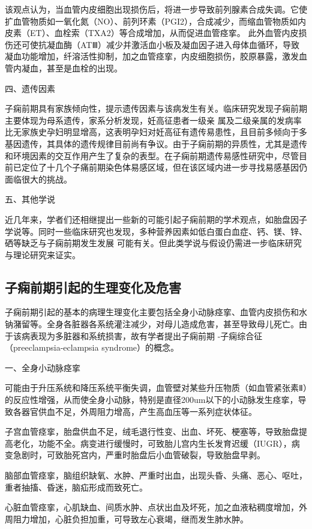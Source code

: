 该观点认为，当血管内皮细胞出现损伤后，将进一步导致前列腺素合成失调\cite{OAG9,Sibai2005}。它使扩血管物质如一氧化氮（NO）、前列环素（PGI2），合成减少，而缩血管物质如内皮素（ET）、血栓索（TXA2）等合成增加，从而促进血管痉挛。
此外血管内皮损伤还可使抗凝血酶（ATⅢ）减少并激活血小板及凝血因子进入母体血循环，导致凝血功能增加，纤溶活性抑制，加之血管痉挛，内皮细胞损伤，胶原暴露，激发血管内凝血，甚至是血栓的出现。

四、遗传因素

子痫前期具有家族倾向性，提示遗传因素与该病发生有关\cite{OAG9,Sibai2005}。临床研究发现子痫前期主要体现为母系遗传，家系分析发现\cite{Ge2013}，妊高征患者一级亲
属及二级亲属的发病率比无家族史孕妇明显增高，这表明孕妇对妊高征有遗传易患性，且目前多倾向于多基因遗传，其具体的遗传规律目前尚有争议。由于子痫前期的异质性，尤其是遗传
和环境因素的交互作用产生了复杂的表型。在子痫前期遗传易感性研究中，尽管目前已定位了十几个子痛前期染色体易感区域，但在该区域内进一步寻找易感基因仍面临很大的挑战。

五、其他学说

近几年来，学者们还相继提出一些新的可能引起子痫前期的学术观点，如胎盘因子学说\cite{Shi2006}等。同时一些临床研究也发现，多种营养因素如低白蛋白血症、钙、镁、锌、硒等缺乏与子痫前期发生发展
可能有关\cite{OAG9}。但此类学说与假设仍需进一步临床研究与理论研究来证实。

\subsection{子痫前期引起的生理变化及危害}
子痫前期引起的基本的病理生理变化主要包括全身小动脉痉挛、血管内皮损伤和水钠潴留等。全身各脏器各系统灌注减少，对母儿造成危害，甚至导致母儿死亡。由于该病表现为多脏器和系统损害，故有学者提出子痫前期
-子痫综合征（preeclampsia-eclampsia syndrome）的概念\cite{a_hospital,OAG9}。

一、全身小动脉痉挛　

可能由于升压系统和降压系统平衡失调，血管壁对某些升压物质（如血管紧张素Ⅱ）的反应性增强，从而使全身小动脉，特别是直径200um以下的小动脉发生痉挛，导致各器官供血不足，外周阻力增高，产生高血压等一系列症状体征。

子宫血管痉挛，胎盘供血不足，绒毛退行性变、出血、坏死、梗塞等，导致胎盘提高老化，功能不全。病变进行缓慢时，可致胎儿宫内生长发育迟缓（IUGR），病变急剧时，可致胎死宫内，严重时胎盘后小血管破裂，导致胎盘早剥。

脑部血管痉挛，脑组织缺氧、水肿、严重时出血，出现头昏、头痛、恶心、呕吐，重者抽搐、昏迷，脑疝形成而致死亡。

心脏血管痉挛，心肌缺血、间质水肿、点状出血及坏死，加之血液粘稠度增加，外周阻力增加，心脏负担加重，可导致左心衰竭，继而发生肺水肿。

